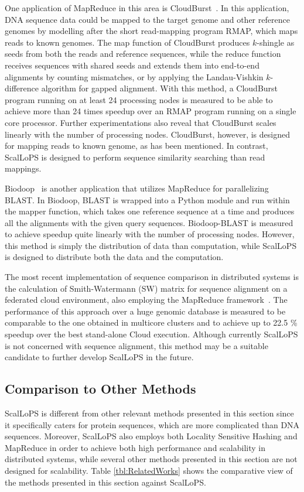 \documentclass[titlepage]{csetr}
\begin{document}
One application of MapReduce in this area is CloudBurst~\cite{CloudBurst}. In this application, DNA sequence data could be mapped to the target genome and other reference genomes by modelling after the short read-mapping program RMAP, which maps reads to known genomes. The map function of CloudBurst produces $k$-shingle as seeds from both the reads and reference sequences, while the reduce function receives sequences with shared seeds and extends them into end-to-end alignments by counting mismatches, or by applying the Landau-Vishkin $k$-difference algorithm for gapped alignment. With this method, a CloudBurst program running on at least 24 processing nodes is measured to be able to achieve more than 24 times speedup over an RMAP program running on a single core processor. Further experimentations also reveal that CloudBurst scales linearly with the number of processing nodes. CloudBurst, however, is designed for mapping reads to known genome, as has been mentioned. In contrast, ScalLoPS is designed to perform sequence similarity searching than read mappings.

Biodoop~\cite{Biodoop} is another application that utilizes MapReduce for parallelizing BLAST. In Biodoop, BLAST is wrapped into a Python module and run within the mapper function, which takes one reference sequence at a time and produces all the alignments with the given query sequences. Biodoop-BLAST is measured to achieve speedup quite linearly with the number of processing nodes. However, this method is simply the distribution of data than computation, while ScalLoPS is designed to distribute both the data and the computation.

The most recent implementation of sequence comparison in distributed systems is the calculation of Smith-Watermann (SW) matrix for sequence alignment on a federated cloud environment, also employing the MapReduce framework~\cite{BioseqComparisonFederatedClouds}. The performance of this approach over a huge genomic database is measured to be comparable to the one obtained in multicore clusters and to achieve up to 22.5 \% speedup over the best stand-alone Cloud execution. Although currently ScalLoPS is not concerned with sequence alignment, this method may be a suitable candidate to further develop ScalLoPS in the future.

\subsection{Comparison to Other Methods}
ScalLoPS is different from other relevant methods presented in this section since it specifically caters for protein sequences, which are more complicated than DNA sequences. Moreover, ScalLoPS also employs both Locality Sensitive Hashing and MapReduce in order to achieve both high performance and scalability in distributed systems, while several other methods presented in this section are not designed for scalability. Table \ref{tbl:RelatedWorks} shows the comparative view of the methods presented in this section against ScalLoPS.
\end{document}
